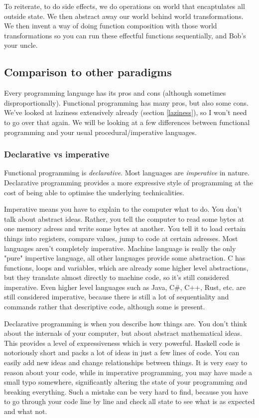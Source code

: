 \documentclass[11pt]{article}
\begin{document}

To reiterate, to do side effects, we do operations on world that encaptulates
all outside state. We then abstract away our world behind world
transformations. We then invent a way of doing function composition with those
world transformations so you can run these effectful functions sequentially,
and Bob's your uncle.

\subsection{Comparison to other paradigms}\label{comparison}

Every programming language has its pros and cons (although sometimes
disproportionally). Functional programming has many pros, but also some cons.
We've looked at laziness extensively already (section \ref{laziness}), so I
won't need to go over that again. We will be looking at a few differences
between functional programming and your usual procedural/imperative languages.

\subsubsection{Declarative vs imperative}

Functional programming is \emph{declarative}. Most languages are
\emph{imperative} in nature. Declarative programming provides a more expressive
style of programming at the cost of being able to optimise the underlying
technicalities.

Imperative means you have to explain to the computer what to do. You don't talk
about abstract ideas. Rather, you tell the computer to read some bytes at one
memory adress and write some bytes at another. You tell it to load certain
things into registers, compare values, jump to code at certain adresses. Most
languages aren't completely imperative. Machine language is really the only
"pure" impertive language, all other languages provide some abstraction. C has
functions, loops and variables, which are already some higher level
abstractions, but they translate almost directly to machine code, so it's still
considered imperative. Even higher level languages such as Java, C\#, C++,
Rust, etc. are still considered imperative, because there is still a lot of
sequentiality and commands rather that descriptive code, although some is
present.

Declarative programming is when you describe how things are. You don't think
about the internals of your computer, but about abstract mathematical ideas.
This provides a level of expressiveness which is very powerful. Haskell code is
notoriously short and packs a lot of ideas in just a few lines of code. You can
easily add new ideas and change relationships between things. It is very easy
to reason about your code, while in imperative programming, you may have made a
small typo somewhere, significantly altering the state of your programming and
breaking everything. Such a mistake can be very hard to find, because you have
to go through your code line by line and check all state to see what is as
expected and what not.
\end{document}
